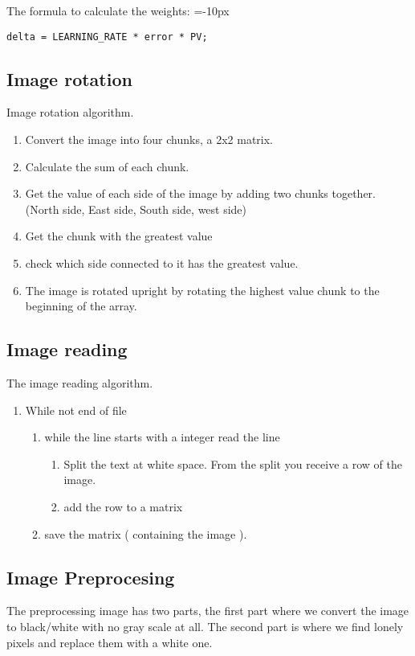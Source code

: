 \documentclass[a4paper, 12pt]{article}
\begin{document}
The formula to calculate the weights:
\belowcaptionskip=-10px
\begin{lstlisting}[label=cd-example, caption=Delta Calculation]
delta = LEARNING_RATE * error * PV;
\end{lstlisting}


\clearpage\subsection{Image rotation}
Image rotation algorithm.
  \begin{enumerate}
  \item Convert the image into four chunks, a 2x2 matrix.
  \item Calculate the sum of each chunk.
  \item Get the value of each side of the image by adding  two chunks together.
  			(North side, East side, South side, west side)
  \item Get the chunk with the greatest value
  \item check which side connected to it has the greatest value.
  \item The image is rotated upright by rotating the highest value chunk to the beginning of the array.
  \end{enumerate}


\subsection{Image reading}
The image reading algorithm.
  \begin{enumerate}
  \item While not end of file
    \begin{enumerate}
    \item while the line starts with a integer read the line
      \begin{enumerate}
      \item Split the text at white space. 
      		From the split you receive a row of the image.
      \item add the row to a matrix
      \end{enumerate}
    \item save the matrix ( containing the image ).
    \end{enumerate}
  \end{enumerate}
  
\clearpage\subsection{Image Preprocesing}
The preprocessing image has two parts, the first part where we convert the image to black/white with no gray scale at all. The second part is where we find lonely pixels and replace them with a white one.
\end{document}
